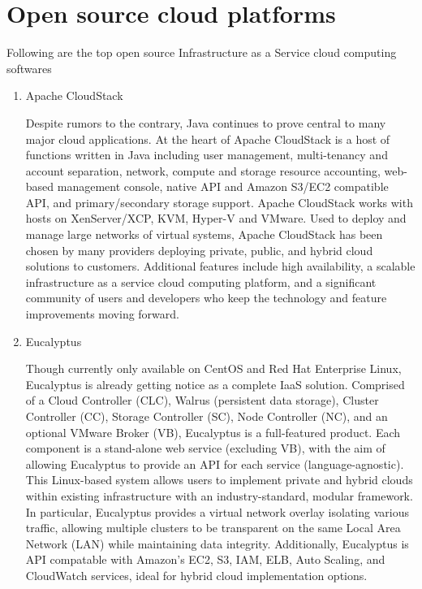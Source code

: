 \section{Open source cloud platforms}

\par Following are the top open source Infrastructure as a Service cloud computing softwares \cite{top}

\begin{enumerate}
    
    \item Apache CloudStack
    \par Despite rumors to the contrary, Java continues to prove central to many major cloud applications. At the heart of Apache CloudStack is a host of functions written in Java including user management, multi-tenancy and account separation, network, compute and storage resource accounting, web-based management console, native API and Amazon S3/EC2 compatible API, and primary/secondary storage support. Apache CloudStack works with hosts on XenServer/XCP, KVM, Hyper-V and VMware. Used to deploy and manage large networks of virtual systems, Apache CloudStack has been chosen by many providers deploying private, public, and hybrid cloud solutions to customers. Additional features include high availability, a scalable infrastructure as a service cloud computing platform, and a significant community of users and developers who keep the technology and feature improvements moving forward.
    
    \item Eucalyptus
    
    \par Though currently only available on CentOS and Red Hat Enterprise Linux, Eucalyptus is already getting notice as a complete IaaS solution. Comprised of a Cloud Controller (CLC), Walrus (persistent data storage), Cluster Controller (CC), Storage Controller (SC), Node Controller (NC), and an optional VMware Broker (VB), Eucalyptus is a full-featured product. Each component is a stand-alone web service (excluding VB), with the aim of allowing Eucalyptus to provide an API for each service (language-agnostic). This Linux-based system allows users to implement private and hybrid clouds within existing infrastructure with an industry-standard, modular framework. In particular, Eucalyptus provides a virtual network overlay isolating various traffic, allowing multiple clusters to be transparent on the same Local Area Network (LAN) while maintaining data integrity. Additionally, Eucalyptus is API compatable with Amazon’s EC2, S3, IAM, ELB, Auto Scaling, and CloudWatch services, ideal for hybrid cloud implementation options.



\end{enumerate}
